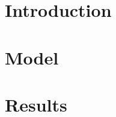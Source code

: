 \documentclass[12pt]{report}
\begin{document}


\tableofcontents

%
%
\chapter{Introduction}









%
%
\chapter{Model}







%
%
\chapter{Results}

%
%



\appendix

\end{document}
